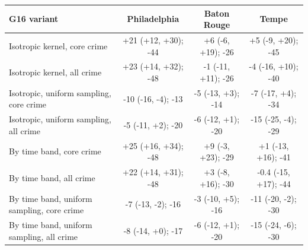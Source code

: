 \begin{tabular}{lccc}
\toprule
G16 variant & Philadelphia & Baton Rouge & Tempe \\
\midrule
Isotropic kernel, core crime & +21 (+12, +30); -44 & +6 (-6, +19); -26 & +5 (-9, +20); -45 \\
Isotropic kernel, all crime & +23 (+14, +32); -48 & -1 (-11, +11); -26 & -4 (-16, +10); -40 \\
Isotropic, uniform sampling, core crime & -10 (-16, -4); -13 & -5 (-13, +3); -14 & -7 (-17, +4); -34 \\
Isotropic, uniform sampling, all crime & -5 (-11, +2); -20 & -6 (-12, +1); -20 & -15 (-25, -4); -29 \\
By time band, core crime & +25 (+16, +34); -48 & +9 (-3, +23); -29 & +1 (-13, +16); -41 \\
By time band, all crime & +22 (+14, +31); -48 & +3 (-8, +16); -30 & -0.4 (-15, +17); -44 \\
By time band, uniform sampling, core crime & -7 (-13, -2); -16 & -3 (-10, +5); -16 & -11 (-20, -2); -30 \\
By time band, uniform sampling, all crime & -8 (-14, +0); -17 & -6 (-12, +1); -20 & -15 (-24, -6); -30 \\
\bottomrule
\end{tabular}
